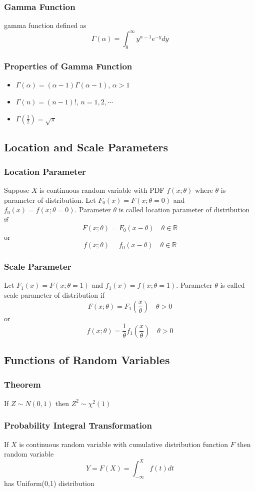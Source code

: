 \documentclass[11pt]{article}
\newcommand{\R}{{\mathbb{R}}}
\begin{document}
\subsubsection{Gamma Function}
gamma function defined as 
\[\Gamma(\alpha)=\int_{0}^{\infty}y^{\alpha-1}e^{-y}dy\]
\subsubsection{Properties of Gamma Function}
\begin{itemize}
    \item $\Gamma(\alpha)=(\alpha-1)\Gamma(\alpha-1)$, $\alpha>1$
    \item $\Gamma(n)=(n-1)!$, $n=1,2,\cdots$
    \item $\Gamma(\frac{1}{2})=\sqrt{\pi}$
\end{itemize}
\subsection{Location and Scale Parameters}
\subsubsection{Location Parameter}
Suppose $X$ is continuous random variable with PDF $f(x;\theta)$ where $\theta$ is parameter of distribution.
Let $F_0(x)=F(x;\theta=0)$ and $f_0(x)=f(x;\theta=0)$. Parameter $\theta$ is called location parameter of distribution if 
\[F(x;\theta)=F_0(x-\theta)\quad\theta\in\R\]
or \[f(x;\theta)=f_0(x-\theta)\quad\theta\in\R\]
\subsubsection{Scale Parameter}
Let $F_1(x)=F(x;\theta=1)$ and $f_1(x)=f(x;\theta=1)$. Parameter $\theta$ is called scale parameter of distribution if
\[F(x;\theta)=F_1(\frac{x}{\theta})\quad\theta>0\]
or \[f(x;\theta)=\frac{1}{\theta}f_1(\frac{x}{\theta})\quad\theta>0\]
\subsection{Functions of Random Variables}
\subsubsection*{Theorem}
If $Z\sim N(0,1)$ then $Z^2\sim\chi^2(1)$
\subsubsection{Probability Integral Transformation}
If $X$ is continuous random variable with cumulative distribution function $F$ then random variable 
\[Y=F(X)=\int_{-\infty}^{X}f(t)dt\]
has Uniform(0,1) distribution 
\end{document}
